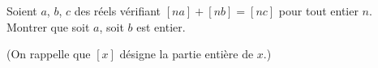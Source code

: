 Soient $a$, $b$, $c$ des réels vérifiant $[na] + [nb] = [nc]$ pour tout entier $n$. Montrer que soit $a$, soit $b$ est entier.

(On rappelle que $[x]$ désigne la partie entière de $x$.)

